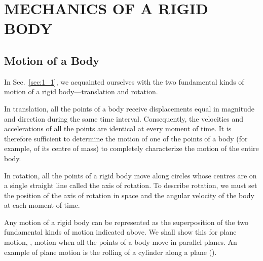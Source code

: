 

\chapter{MECHANICS OF A RIGID BODY}\label{chap:5}

\section{Motion of a Body}\label{sec:5_1}

In Sec.~\ref{sec:1_1}, we acquainted ourselves with the two fundamental kinds of motion of a rigid body---translation and rotation.

In translation, all the points of a body receive displacements equal in magnitude and direction during the same time interval. Consequently, the velocities and accelerations of all the points are identical at every moment of time. It is therefore sufficient to determine the motion of one of the points of a body (for example, of its centre of mass) to completely characterize the motion of the entire body.

In rotation, all the points of a rigid body move along circles whose centres are on a single straight line called the axis of rotation. To describe rotation, we must set the position of the axis of rotation in space and the angular velocity of the body at each moment of time.

Any motion of a rigid body can be represented as the superposition of the two fundamental kinds of motion indicated above. We shall show this for plane motion, \ie, motion when all the points of a body move in parallel planes. An example of plane motion is the rolling of a cylinder along a plane ().

